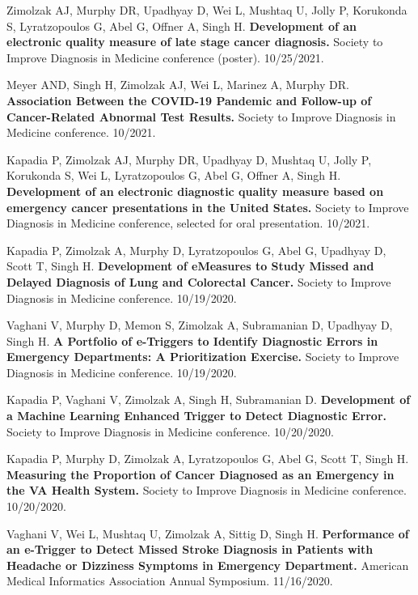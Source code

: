 \documentclass[10pt]{article}
\begin{document}

Zimolzak AJ, Murphy DR, Upadhyay D, Wei L, Mushtaq U, Jolly P,
Korukonda S, Lyratzopoulos G, Abel G, Offner A, Singh H.
\textbf{Development of an electronic quality measure of late stage
  cancer diagnosis.} Society to Improve Diagnosis in Medicine
conference (poster). 10/25/2021.

Meyer AND, Singh H, Zimolzak AJ, Wei L, Marinez A, Murphy DR.
\textbf{Association Between the COVID-19 Pandemic and Follow-up of
  Cancer-Related Abnormal Test Results.} Society to Improve Diagnosis
in Medicine conference. 10/2021.

Kapadia P, Zimolzak AJ, Murphy DR, Upadhyay D, Mushtaq U, Jolly P,
Korukonda S, Wei L, Lyratzopoulos G, Abel G, Offner A, Singh H.
\textbf{Development of an electronic diagnostic quality measure based
  on emergency cancer presentations in the United States.} Society to
Improve Diagnosis in Medicine conference, selected for oral
presentation. 10/2021.


Kapadia P, Zimolzak A, Murphy D, Lyratzopoulos G, Abel G, Upadhyay D,
Scott T, Singh H. \textbf{Development of eMeasures to Study Missed and
  Delayed Diagnosis of Lung and Colorectal Cancer.} Society to Improve
Diagnosis in Medicine conference. 10/19/2020.

Vaghani V, Murphy D, Memon S, Zimolzak A, Subramanian D, Upadhyay D,
Singh H. \textbf{A Portfolio of e-Triggers to Identify Diagnostic
  Errors in Emergency Departments: A Prioritization Exercise.} Society
to Improve Diagnosis in Medicine conference. 10/19/2020.

Kapadia P, Vaghani V, Zimolzak A, Singh H, Subramanian D.
\textbf{Development of a Machine Learning Enhanced Trigger to Detect
  Diagnostic Error.} Society to Improve Diagnosis in Medicine
conference. 10/20/2020.

Kapadia P, Murphy D, Zimolzak A, Lyratzopoulos G, Abel G, Scott T,
Singh H. \textbf{Measuring the Proportion of Cancer Diagnosed as an
  Emergency in the VA Health System.} Society to Improve Diagnosis in
Medicine conference. 10/20/2020.


Vaghani V, Wei L, Mushtaq U, Zimolzak A, Sittig D, Singh H.
\textbf{Performance of an e-Trigger to Detect Missed Stroke Diagnosis
  in Patients with Headache or Dizziness Symptoms in Emergency
  Department.} American Medical Informatics Association Annual
Symposium. 11/16/2020.
\end{document}
